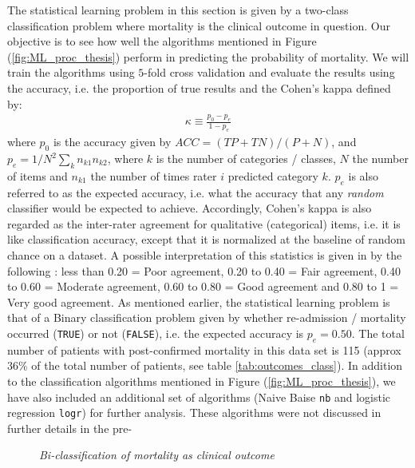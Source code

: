 \documentclass[../thesis.tex]{subfiles}
\begin{document}
\noindent The statistical learning problem in this section is given by a two-class classification problem where mortality is the clinical outcome in question. Our objective is to see how well the algorithms mentioned in Figure (\ref{fig:ML_proc_thesis}) perform in predicting the probability of mortality. We will train the algorithms using $5$-fold cross validation and evaluate the results using the accuracy, i.e. the proportion of true results and the Cohen's kappa defined by:
\begin{align}
    \kappa \equiv \frac{p_0 - p_e}{1 - p_e}
\end{align}
where $p_0$ is the accuracy given by ${\mathit  {ACC}}=({\mathit  {TP}}+{\mathit  {TN}})/(P+N)$, and $p_e = 1 / N^2 \sum_{k} n_{k1}n_{k2}$, where $k$ is the number of categories / classes, $N$ the number of items and $n_{k1}$ the number of times rater $i$ predicted category $k$. $p_e$ is also referred to as the expected accuracy, i.e. what the accuracy that any \textit{random} classifier would be expected to achieve. Accordingly, Cohen's kappa is also regarded as the inter-rater agreement for qualitative (categorical) items, i.e. it is like classification accuracy, except that it is normalized at the baseline of random chance on a dataset. A possible interpretation of this statistics is given in by the following \citep{ashby1991practical}: less than 0.20 = Poor agreement, 0.20 to 0.40 = Fair agreement, 0.40 to 0.60 = Moderate agreement, 0.60 to 0.80 = Good agreement and 0.80 to 1 = Very good agreement. As mentioned earlier, the statistical learning problem is that of a Binary classification problem given by whether  re-admission / mortality occurred (\texttt{TRUE}) or not (\texttt{FALSE}), i.e. the expected accuracy is $p_e = 0.50$. The total number of patients with post-confirmed mortality in this data set is 115 (approx 36\% of the total number of patients, see table \ref{tab:outcomes_class}). In addition to the classification algorithms mentioned in Figure (\ref{fig:ML_proc_thesis}), we have also included an additional set of algorithms (Naive Baise \texttt{nb} and logistic regression \texttt{logr}) for further analysis. These algorithms were not discussed in further details in the pre- 
\begin{figure}[h!]
    \centering
    \scalebox{.8}{}
    \caption[Bi-classification of mortality as clinical outcome]{\textit{Bi-classification of mortality as clinical outcome}}
    \label{fig:bi_class_mort}
\end{figure}
\end{document}
